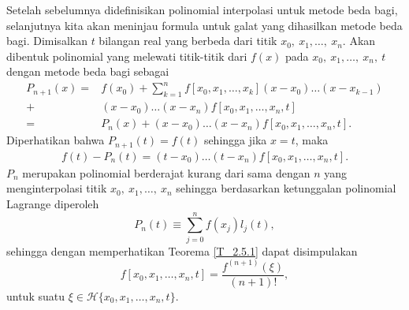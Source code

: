 Setelah sebelumnya didefinisikan polinomial interpolasi untuk metode beda bagi, selanjutnya kita akan meninjau formula untuk galat yang dihasilkan metode beda bagi. Dimisalkan $t$ bilangan real yang berbeda dari titik $x_0,~x_1,\dots,~x_n$. Akan dibentuk polinomial yang melewati titik-titik dari $f(x)$ pada $x_0,~x_1,\dots,~x_n,~t$ dengan metode beda bagi sebagai
\begin{align*}
    P_{n+1}(x)=&f(x_0)+\sum_{k=1}^{n} f[x_0,x_1, \dots , x_k](x-x_0)\dots(x-x_{k-1}) \\
    +& (x-x_0)\dots(x-x_n)f[x_0,x_1,\dots,x_n,t] \\
    =& P_n(x) + (x-x_0)\dots(x-x_n)f[x_0,x_1,\dots,x_n,t].
\end{align*}
Diperhatikan bahwa $P_{n+1}(t) = f(t)$ sehingga jika $x=t$, maka
\begin{align*}
    f(t) - P_n(t) = (t-x_0)\dots(t-x_n)f[x_0,x_1,\dots,x_n,t].
\end{align*}
$P_n$ merupakan polinomial berderajat kurang dari sama dengan $n$ yang menginterpolasi titik $x_0,~x_1,\dots,~x_n$ sehingga berdasarkan ketunggalan polinomial Lagrange diperoleh
\begin{equation*}
    P_n(t) \equiv \sum_{j=0}^n f(x_j)l_j(t),
\end{equation*}
sehingga dengan memperhatikan Teorema \ref{T_2.5.1} dapat disimpulakan
\begin{equation*}\label{errorBedaBagi}
    f[x_0,x_1,\dots,x_n,t] = \frac{f^{(n+1)}(\xi)}{(n+1)!},
\end{equation*}
untuk suatu $\xi \in \mathcal{H}\{x_0,x_1,\dots,x_n,t\}$.

